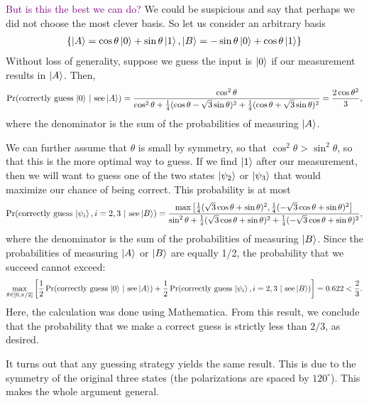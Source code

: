 \documentclass{article}
\theoremstyle{definition}
\newcommand{\f}[2]{\frac{#1}{#2}}
\newcommand{\lb}{\left[}
\newcommand{\rb}{\right]}
\begin{document}
\begin{enumerate}[label=(\alph*)]
	\textcolor{purple}{But is this the best we can do?} We could be suspicious and say that perhaps we did not choose the most clever basis. So let us consider an arbitrary basis 
	\begin{align*}
		\{ \ket{A} = \cos\theta \ket{0} + \sin\theta \ket{1} , \ket{B} =  -\sin\theta\ket{0} + \cos\theta\ket{1}    \}
	\end{align*}
	Without loss of generality, suppose we guess the input is $\ket{0}$ if our measurement results in $\ket{A}$. Then, 
	\begin{align*}
		\Pr(\text{correctly guess $\ket{0}$}\,\, | \,\, \text{see} \ket{A}) =  \f{\cos^2\theta}{\cos^2\theta + \f{1}{4}(\cos\theta - \sqrt{3}\sin\theta)^2 + \f{1}{4}(\cos\theta + \sqrt{3}\sin\theta)^2} = \f{2\cos\theta^2}{3},
	\end{align*}
	where the denominator is the sum of the probabilities of measuring $\ket{A}$. 
	
	
	We can further assume that $\theta$ is small by symmetry, so that $\cos^2\theta > \sin^2\theta$, so that this is the more optimal way to guess. If we find $\ket{1}$ after our measurement, then we will want to guess one of the two states $\ket{\psi_2}$ or $\ket{\psi_3}$ that would maximize our chance of being correct. This probability is at most
	\begin{align*}
		\Pr(\text{correctly guess $\ket{\psi_i}, i = 2,3$}\,\, | \,\, \text{see} \ket{B}) =
		\f{\max\lb \f{1}{4}(\sqrt{3}\cos\theta + \sin\theta)^2 , \f{1}{4}(-\sqrt{3}\cos\theta + \sin\theta)^2\rb}{\sin^2\theta + \f{1}{4}(\sqrt{3}\cos\theta + \sin\theta)^2 + \f{1}{4}(-\sqrt{3}\cos\theta + \sin\theta)^2},
	\end{align*}
	where the denominator is the sum of the probabilities of measuring $\ket{B}$. Since the probabilities of measuring $\ket{A}$ or $\ket{B}$ are equally 1/2, the probability that we succeed cannot exceed:
	\begin{align*}
		\max_{\theta\in [0,\pi/2]}\lb \f{1}{2}\Pr(\text{correctly guess $\ket{0}$}\,\, | \,\, \text{see} \ket{A}) + \f{1}{2}	\Pr(\text{correctly guess $\ket{\psi_i}, i = 2,3$}\,\, | \,\, \text{see} \ket{B}) \rb = 0.622 < \f{2}{3}.
	\end{align*}
	Here, the calculation was done using Mathematica. From this result, we conclude that the probability that we make a correct guess is strictly less than $2/3$, as desired. 
	
	It turns out that any guessing strategy yields the same result. This is due to the symmetry of the original three states (the polarizations are spaced by $120^\circ$). This makes the whole argument general. \\
	

\end{enumerate}
\end{document}
